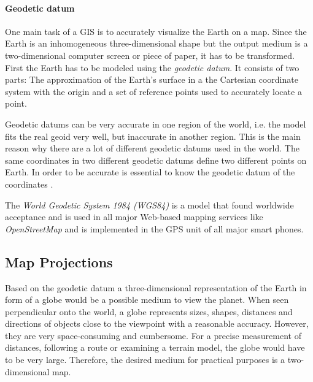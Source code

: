 

\paragraph{Geodetic datum} %
\label{par:geodetic_datum}


One main task of a GIS is to accurately visualize the Earth on a map. Since the Earth is an inhomogeneous three-dimensional shape but the output medium is a two-dimensional computer screen or piece of paper, it has to be transformed. First the Earth has to be modeled using the \emph{geodetic datum}. It consists of two parts: The approximation of the Earth's surface in a the Cartesian coordinate system with the origin and a set of reference points used to accurately locate a point.

Geodetic datums can be very accurate in one region of the world, i.e. the model fits the real geoid very well, but inaccurate in another region. This is the main reason why there are a lot of different geodetic datums used in the world. The same coordinates in two different geodetic datums define two different points on Earth. In order to be accurate is essential to know the geodetic datum of the coordinates
\cite[p. 80]{bolstad2008gis}.

The \emph{World Geodetic System 1984 (WGS84)} is a model that found worldwide acceptance and is used in all major Web-based mapping services like \emph{OpenStreetMap} and is implemented in the GPS unit of all major smart phones.




\subsection{Map Projections} %
\label{ssub:map_projections}

Based on the geodetic datum a three-dimensional representation of the Earth in form of a globe would be a possible medium to view the planet. When seen perpendicular onto the world, a globe represents sizes, shapes, distances and directions of objects close to the viewpoint with a reasonable accuracy. However, they are very space-consuming and cumbersome. For a precise measurement of distances, following a route or examining a terrain model, the globe would have to be very large. Therefore, the desired medium for practical purposes is a two-dimensional map.

